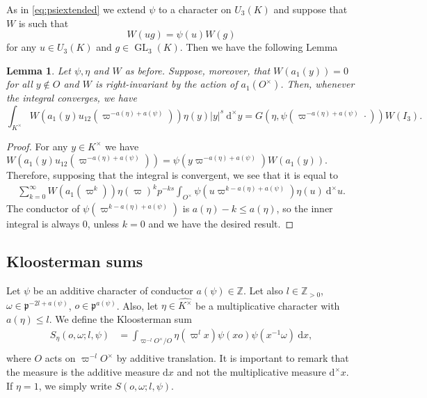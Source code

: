 \documentclass[a4paper,11pt]{amsart}
\newtheorem{lemma}[theorem]{Lemma}
\theoremstyle{definition}
\newcommand{\Z}{\mathbb{Z}}
\newcommand{\gelle}{\operatorname{GL}}
\begin{document}
As in \eqref{eq:psiextended} we extend $\psi$ to a character on $U_3(K)$ and suppose that $W$ is such that $$W(ug) = \psi(u)W(g)$$ for any $u\in U_3(K)$ and $g\in \gelle_3(K)$. Then we have the following Lemma 
\begin{lemma}\label{lem:shiftnewform}Let $\psi,\eta$ and $W$ as before. Suppose, moreover, that $W(a_1(y))= 0$ for all $y \notin O$ and $W$ is right-invariant by the action of $a_1(O^\times)$. Then, whenever the integral converges, we have
\[\int_{K^\times}W(a_1(y)u_{12}(\varpi^{-a(\eta)+a(\psi)}))\eta(y)\vert y\vert^{s}\ \mathrm{d}^\times y = G(\eta,\psi(\varpi^{-a(\eta)+a(\psi)}\cdot)) W(I_3).\]
\end{lemma}
\begin{proof} For any $y\in K^\times$ we have $W(a_1(y)u_{12}(\varpi^{-a(\eta)+a(\psi)}))= \psi(y\varpi^{-a(\eta)+a(\psi)})W(a_1(y))$. Therefore, supposing that the integral is convergent, we see that it is equal to
\begin{align*}
    \sum_{k=0}^\infty W(a_1(\varpi^k))\eta(\varpi)^k p^{-ks}\int_{O^{\times}}\psi(u\varpi^{k-a(\eta)+a(\psi)})\eta(u)\ \mathrm{d}^\times u.\end{align*}
    The conductor of $\psi( \varpi^{k-a(\eta)+a(\psi)})$ is $a(\eta)-k \leq a(\eta)$, so the inner integral is always $0$, unless $k=0$ and we have the desired result.
\end{proof}








\subsection{Kloosterman sums}
Let $\psi$ be an additive character of conductor $a(\psi)\in \Z$. Let also $l\in \Z_{>0}$, $\omega\in \mathfrak{p}^{-2l+a(\psi)}$, $o \in \mathfrak{p}^{a(\psi)}$. Also, let $\eta\in \widehat{K^{\times}}$ be a multiplicative character with $a(\eta)\leq l$. We define the Kloosterman sum
\begin{align*}\label{eq:Kloostermansumdefinition}
    S_{\eta}(o,\omega;l,\psi) &= \int_{\varpi^{-l}O^{\times}/O}\eta(\varpi^lx)\psi(xo)\psi(x^{-1}\omega)\ \mathrm{d}x,\\ 
\end{align*}
    where $O$ acts on $\varpi^{-l}O^{\times}$ by additive translation. It is important to remark that the measure is the additive measure $\mathrm{d}x$ and not the multiplicative measure $\mathrm{d}^{\times}x$.
    If $\eta = 1$, we simply write $S(o,\omega;l,\psi)$.
\end{document}
